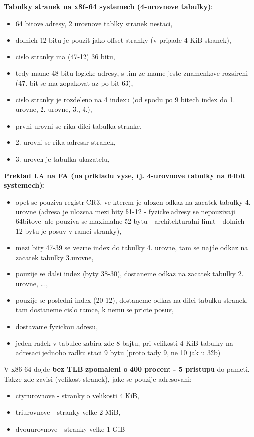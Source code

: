 \documentclass[a4paper, 11pt]{article}
\begin{document}
\textbf{Tabulky stranek na x86-64 systemech (4-urovnove tabulky):}
\begin{itemize}
    \item 64 bitove adresy, 2 urovnove tablky stranek nestaci,
    \item dolnich 12 bitu je pouzit jako offset stranky (v pripade 4 KiB stranek),
    \item cislo stranky ma (47-12) 36 bitu,
    \item tedy mame 48 bitu logicke adresy, s tim ze mame jeste znamenkove rozsireni (47. bit se ma zopakovat az po bit 63),
    \item cislo stranky je rozdeleno na 4 indexu (od spodu po 9 bitech index do 1. urovne, 2. urovne, 3., 4.),
    \item prvni urovni se rika dilci tabulka stranke,
    \item 2. urovni se rika adresar stranek,
    \item 3. uroven je tabulka ukazatelu, \\
\end{itemize}

\textbf{Preklad LA na FA (na prikladu vyse, tj. 4-urovnove tabulky na 64bit systemech):}
\begin{itemize}
    \item opet se pouziva registr CR3, ve kterem je ulozen odkaz na zacatek tabulky 4. urovne (adresa je ulozena mezi bity 51-12 - fyzicke adresy se nepouzivaji 64bitove, ale pouziva se maximalne 52 bytu - architekturalni limit - dolnich 12 bytu je posuv v ramci stranky),
    \item mezi bity 47-39 se vezme index do tabulky 4. urovne, tam se najde odkaz na zacatek tabulky 3.urovne, 
    \item pouzije se dalsi index (byty 38-30), dostaneme odkaz na zacatek tabulky 2. urovne, ...,
    \item pouzije se posledni index (20-12), dostaneme odkaz na dilci tabulku stranek, tam dostaneme cislo ramce, k nemu se pricte posuv,
    \item dostavame fyzickou adresu,
    \item jeden radek v tabulce zabira zde 8 bajtu, pri velikosti 4 KiB tabulky na adresaci jednoho radku staci 9 bytu (proto tady 9, ne 10 jak u 32b) \\
\end{itemize}

V x86-64 dojde \textbf{bez TLB zpomaleni o 400 procent - 5 pristupu} do pameti. Takze zde zavisi (velikost stranek), jake se pouzije adresovani:
\begin{itemize}
    \item ctyrurovnove - stranky o velikosti 4 KiB,
    \item triurovnove - stranky velke 2 MiB,
    \item dvouurovnove - stranky velke 1 GiB \\
\end{itemize}
\end{document}
